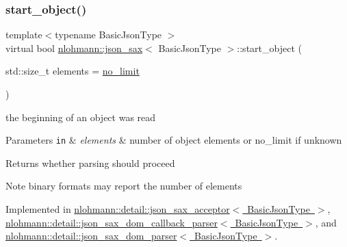 \subsubsection{\texorpdfstring{start\+\_\+object()}{start\_object()}}
{\footnotesize\ttfamily template$<$typename Basic\+Json\+Type $>$ \\
virtual bool \mbox{\hyperlink{structnlohmann_1_1json__sax}{nlohmann\+::json\+\_\+sax}}$<$ Basic\+Json\+Type $>$\+::start\+\_\+object (\begin{DoxyParamCaption}\item[{std\+::size\+\_\+t}]{elements = {\ttfamily \mbox{\hyperlink{structnlohmann_1_1json__sax_a84031c6bbd5b85ec13da024fe9e2b9c9}{no\+\_\+limit}}} }\end{DoxyParamCaption})\hspace{0.3cm}{\ttfamily [pure virtual]}}



the beginning of an object was read 


\begin{DoxyParams}[1]{Parameters}
\mbox{\tt in}  & {\em elements} & number of object elements or no\+\_\+limit if unknown \\
\hline
\end{DoxyParams}
\begin{DoxyReturn}{Returns}
whether parsing should proceed 
\end{DoxyReturn}
\begin{DoxyNote}{Note}
binary formats may report the number of elements 
\end{DoxyNote}


Implemented in \mbox{\hyperlink{classnlohmann_1_1detail_1_1json__sax__acceptor_ace7998d71c96f939facaa19164316193}{nlohmann\+::detail\+::json\+\_\+sax\+\_\+acceptor$<$ Basic\+Json\+Type $>$}}, \mbox{\hyperlink{classnlohmann_1_1detail_1_1json__sax__dom__callback__parser_a6f10254970dbbc484f12752a7a3362b4}{nlohmann\+::detail\+::json\+\_\+sax\+\_\+dom\+\_\+callback\+\_\+parser$<$ Basic\+Json\+Type $>$}}, and \mbox{\hyperlink{classnlohmann_1_1detail_1_1json__sax__dom__parser_aa4b694ee448999880c567218778f5078}{nlohmann\+::detail\+::json\+\_\+sax\+\_\+dom\+\_\+parser$<$ Basic\+Json\+Type $>$}}.

\mbox{\label{structnlohmann_1_1json__sax_a07eab82f6c82d606787eee9ad73d2bda}} 
